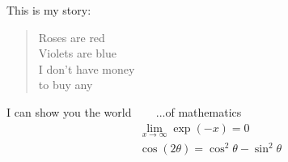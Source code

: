 \documentclass[a4paper,12pt]{article}
\begin{document}
This is my story:

\begin{verse}
Roses are red \\
Violets are blue \\
I don't have money \\
to buy any \\
\end{verse}

I can show you the world \eighthnote \twonotes \eighthnote \twonotes ~~~ ...of mathematics \\

\begin{align}
\lim_{x \to \infty} \exp(-x) = 0 \\
\cos (2\theta) = \cos^2 \theta - \sin^2 \theta
\end{align}
\end{document}
